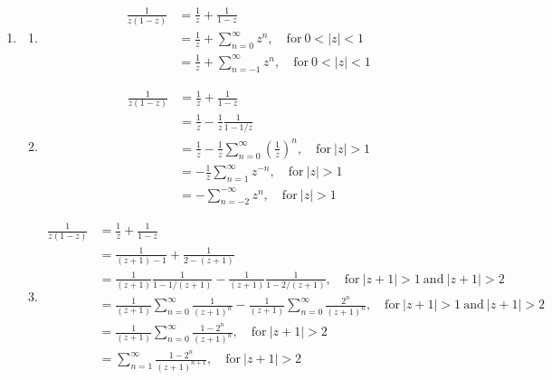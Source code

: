 {\begin{Solution}
  \label{solution laurent 1z1z}
  \begin{enumerate}
  \item 
    \begin{enumerate}
    \item 
      \begin{align*}
        \frac{1}{z (1 - z)}
        &= \frac{1}{z} + \frac{1}{1 - z}
        \\
        &= \frac{1}{z} + \sum_{n = 0}^\infty z^n, \quad \mathrm{for}\ 0 < |z| < 1
        \\
        &= \frac{1}{z} + \sum_{n = -1}^\infty z^n, \quad \mathrm{for}\ 0 < |z| < 1
      \end{align*}
    \item 
      \begin{align*}
        \frac{1}{z (1 - z)}
        &= \frac{1}{z} + \frac{1}{1 - z}
        \\
        &= \frac{1}{z} - \frac{1}{z} \frac{1}{1 - 1/z}
        \\
        &= \frac{1}{z} - \frac{1}{z} \sum_{n = 0}^\infty \left( \frac{1}{z} \right)^n, 
        \quad \mathrm{for}\ |z| > 1
        \\
        &= - \frac{1}{z} \sum_{n = 1}^\infty z^{-n}, \quad \mathrm{for}\ |z| > 1
        \\
        &= - \sum_{n = -2}^{-\infty} z^n, \quad \mathrm{for}\ |z| > 1
      \end{align*}
    \item 
      \begin{align*}
        \frac{1}{z (1 - z)}
        &= \frac{1}{z} + \frac{1}{1 - z}
        \\
        &= \frac{1}{(z + 1) - 1} + \frac{1}{2 - (z + 1)}
        \\
        &= \frac{1}{(z + 1)} \frac{1}{1 - 1/(z + 1)} 
        - \frac{1}{(z + 1)} \frac{1}{1 - 2/(z + 1)},
        \quad \mathrm{for}\ |z + 1| > 1\ \mathrm{and}\ |z + 1| > 2
        \\
        &= \frac{1}{(z + 1)} \sum_{n = 0}^\infty \frac{1}{(z + 1)^n}
        - \frac{1}{(z + 1)} \sum_{n = 0}^\infty \frac{2^n}{(z + 1)^n},
        \quad \mathrm{for}\ |z + 1| > 1\ \mathrm{and}\ |z + 1| > 2
        \\
        &= \frac{1}{(z + 1)} \sum_{n = 0}^\infty \frac{1 - 2^n}{(z + 1)^n},
        \quad \mathrm{for}\ |z + 1| > 2
        \\
        &= \sum_{n = 1}^\infty \frac{1 - 2^n}{(z + 1)^{n + 1}},
        \quad \mathrm{for}\ |z + 1| > 2

\end{align*}
\end{enumerate}
\end{enumerate}
\end{Solution}}
